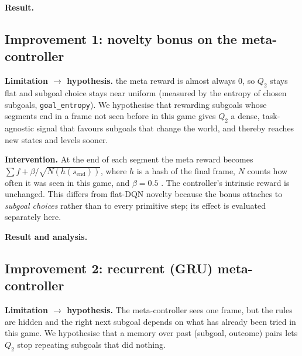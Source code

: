\textbf{Result.} 

\subsection{Improvement 1: novelty bonus on the meta-controller}\label{sec:hdqn-nov}
\textbf{Limitation $\to$ hypothesis.}  the meta reward is
almost always 0, so $Q_2$ stays flat and subgoal choice stays near uniform
(measured by the entropy of chosen subgoals, \texttt{goal\_entropy}). We
hypothesise that rewarding subgoals whose segments end in a frame not seen before
in this game gives $Q_2$ a dense, task-agnostic signal that favours subgoals that
change the world, and thereby reaches new states and levels sooner.

\textbf{Intervention.} At the end of each segment the meta reward becomes
$\sum f + \beta/\sqrt{N(h(s_{\text{end}}))}$, where $h$ is a hash of the final frame,
$N$ counts how often it was seen in this game, and $\beta=0.5$
\citep{bellemare2016count}. The controller's intrinsic reward is unchanged. This
differs from flat-DQN novelty because the bonus attaches to \emph{subgoal choices}
rather than to every primitive step; its effect is evaluated separately here.

\textbf{Result and analysis.} 

\subsection{Improvement 2: recurrent (GRU) meta-controller}\label{sec:hdqn-gru}
\textbf{Limitation $\to$ hypothesis.} The meta-controller sees one frame, but the
rules are hidden and the right next subgoal depends on what has already been
tried in this game.  We hypothesise that a memory over past (subgoal, outcome)
pairs lets $Q_2$ stop repeating subgoals that did nothing.

